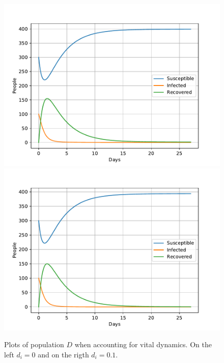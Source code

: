 \documentclass[a4paper]{article}
\begin{document}
\begin{figure}[!htb]
	\includegraphics[scale=0.56]{../plots/opp_c_D0.pdf}
	\includegraphics[scale=0.56]{../plots/opp_c_D1.pdf}	
	\caption{Plots of population $D$ when accounting for vital dynamics. On the left $d_i=0$ and on the rigth $d_i=0.1$.}
	\label{opp_c0D}
\end{figure}
\end{document}
